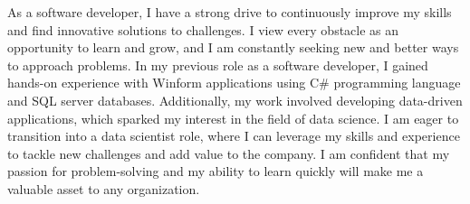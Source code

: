 

\begin{cvparagraph}

As a software developer, I have a strong drive to continuously improve my skills and find innovative solutions to challenges. I view every obstacle as an opportunity to learn and grow, and I am constantly seeking new and better ways to approach problems. In my previous role as a software developer, I gained hands-on experience with Winform applications using C\# programming language and SQL server databases. Additionally, my work involved developing data-driven applications, which sparked my interest in the field of data science. I am eager to transition into a data scientist role, where I can leverage my skills and experience to tackle new challenges and add value to the company. I am confident that my passion for problem-solving and my ability to learn quickly will make me a valuable asset to any organization.
\end{cvparagraph}